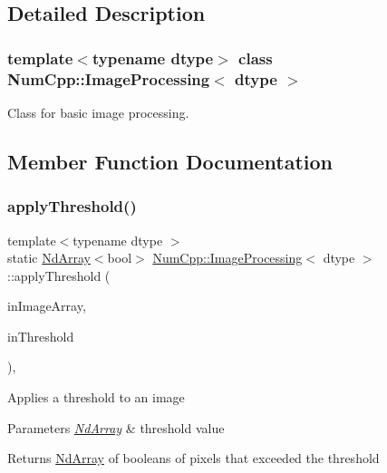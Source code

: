 \subsection{Detailed Description}
\subsubsection*{template$<$typename dtype$>$\newline
class Num\+Cpp\+::\+Image\+Processing$<$ dtype $>$}

Class for basic image processing. 

\subsection{Member Function Documentation}
\mbox{\label{class_num_cpp_1_1_image_processing_a1dc18ba020a8414266f4e86e0643891d}} 
\subsubsection{\texorpdfstring{apply\+Threshold()}{applyThreshold()}}
{\footnotesize\ttfamily template$<$typename dtype $>$ \\
static \mbox{\hyperlink{class_num_cpp_1_1_nd_array}{Nd\+Array}}$<$bool$>$ \mbox{\hyperlink{class_num_cpp_1_1_image_processing}{Num\+Cpp\+::\+Image\+Processing}}$<$ dtype $>$\+::apply\+Threshold (\begin{DoxyParamCaption}\item[{const \mbox{\hyperlink{class_num_cpp_1_1_nd_array}{Nd\+Array}}$<$ dtype $>$ \&}]{in\+Image\+Array,  }\item[{dtype}]{in\+Threshold }\end{DoxyParamCaption})\hspace{0.3cm}{\ttfamily [inline]}, {\ttfamily [static]}}

Applies a threshold to an image


\begin{DoxyParams}{Parameters}
{\em \mbox{\hyperlink{class_num_cpp_1_1_nd_array}{Nd\+Array}}} & threshold value \\
\hline
\end{DoxyParams}
\begin{DoxyReturn}{Returns}
\mbox{\hyperlink{class_num_cpp_1_1_nd_array}{Nd\+Array}} of booleans of pixels that exceeded the threshold 
\end{DoxyReturn}
\mbox{\label{class_num_cpp_1_1_image_processing_a0bbb3a42b99182e1efdae02dec778832}} 
